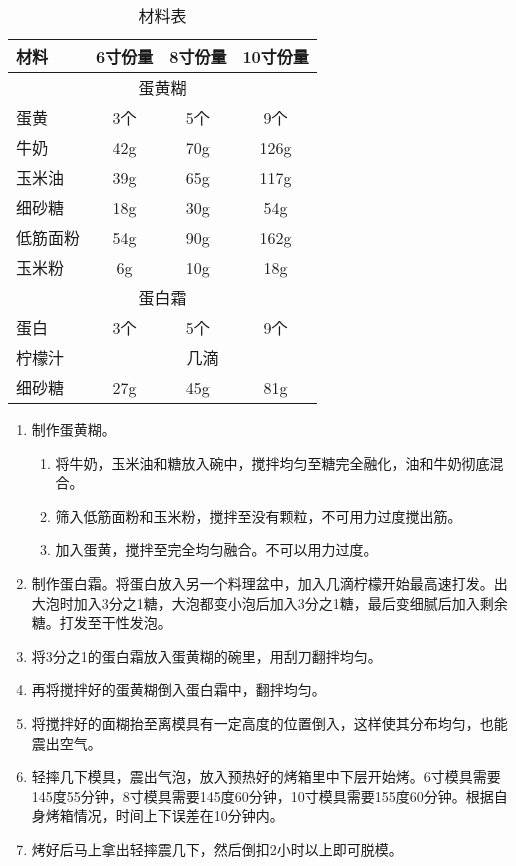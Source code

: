 \begin{table}[h]
    \centering
    \begin{tabular}{|l||c|c|c|}\hline
     \textbf{材料}    &  \textbf{6寸份量}& \textbf{8寸份量} &\textbf{10寸份量}\\ \hline\hline
    \multicolumn{4}{|c|}{蛋黄糊}\\ \hline
    蛋黄 & 3个 & 5个& 9个\\ \hline
    牛奶 & 42g & 70g& 126g\\ \hline
    玉米油 & 39g & 65g& 117g\\ \hline
    细砂糖 & 18g & 30g& 54g\\ \hline
    低筋面粉 & 54g & 90g& 162g\\ \hline
    玉米粉 & 6g & 10g& 18g\\ \hline
    \multicolumn{4}{|c|}{蛋白霜}\\ \hline
    蛋白 & 3个 & 5个& 9个\\ \hline
    柠檬汁 & \multicolumn{3}{|c|}{几滴}\\ \hline
    细砂糖 & 27g & 45g& 81g\\ \hline
    \end{tabular}
    \caption{材料表}
\end{table}

\begin{enumerate}
    \item 制作蛋黄糊。
    \begin{enumerate}
        \item 将牛奶，玉米油和糖放入碗中，搅拌均匀至糖完全融化，油和牛奶彻底混合。
        \item 筛入低筋面粉和玉米粉，搅拌至没有颗粒，不可用力过度搅出筋。
        \item 加入蛋黄，搅拌至完全均匀融合。不可以用力过度。
    \end{enumerate}
    \item 制作蛋白霜。将蛋白放入另一个料理盆中，加入几滴柠檬开始最高速打发。出大泡时加入3分之1糖，大泡都变小泡后加入3分之1糖，最后变细腻后加入剩余糖。打发至干性发泡。
    \item 将3分之1的蛋白霜放入蛋黄糊的碗里，用刮刀翻拌均匀。
    \item 再将搅拌好的蛋黄糊倒入蛋白霜中，翻拌均匀。
    \item 将搅拌好的面糊抬至离模具有一定高度的位置倒入，这样使其分布均匀，也能震出空气。
    \item 轻摔几下模具，震出气泡，放入预热好的烤箱里中下层开始烤。6寸模具需要145度55分钟，8寸模具需要145度60分钟，10寸模具需要155度60分钟。根据自身烤箱情况，时间上下误差在10分钟内。
    \item 烤好后马上拿出轻摔震几下，然后倒扣2小时以上即可脱模。

\end{enumerate}


